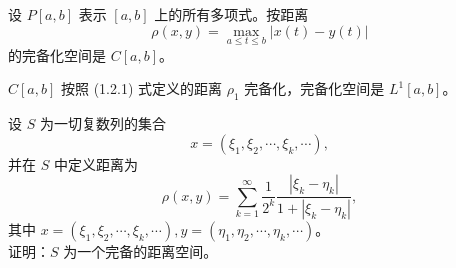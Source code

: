 \documentclass[lang=cn,newtx,10pt,scheme=chinese,thmcnt=chapter]{elegantbook}
\begin{document}
\begin{example}
设 \( P[a, b] \) 表示 \( [a, b] \) 上的所有多项式。按距离
\[
\rho(x, y) = \max_{a \leqslant t \leqslant b} |x(t) - y(t)|
\]
的完备化空间是 \( C[a, b] \)。
\end{example}

\begin{example}
 \( C[a, b] \) 按照 (1.2.1) 式定义的距离 \( \rho_1 \) 完备化，完备化空间是 \( L^1[a, b] \)。
\end{example}
\begin{example}
设 \( S \) 为一切复数列的集合
\[
x = \left(\xi_1, \xi_2, \cdots, \xi_k, \cdots\right),
\]
并在 \( S \) 中定义距离为
\[
\rho(x, y) = \sum_{k=1}^{\infty} \frac{1}{2^k} \frac{\left|\xi_k - \eta_k\right|}{1 + \left|\xi_k - \eta_k\right|},
\]
其中 \( x = \left(\xi_1, \xi_2, \cdots, \xi_k, \cdots\right), y = \left(\eta_1, \eta_2, \cdots, \eta_k, \cdots\right) \)。\\
证明：\( S \) 为一个完备的距离空间。

\end{example}
\end{document}
